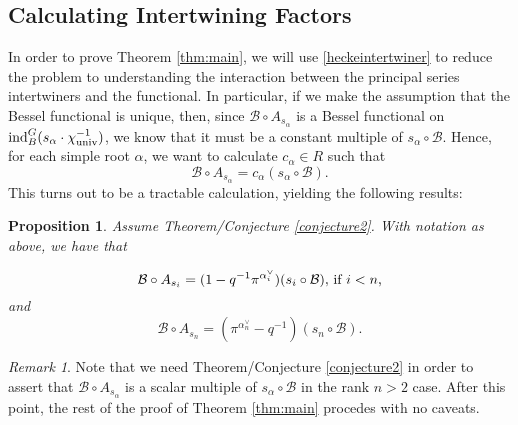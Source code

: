 \documentclass[11pt,letterpaper]{article}
\newcommand{\A}{\mathcal{A}}
\newcommand{\calB}{\mathcal{B}}
\newcommand{\ind}{\textup{ind}}
\newtheorem{Proposition}[Theorem]{Proposition}
\theoremstyle{remark}
\newtheorem*{remark}{Remark}
\numberwithin{equation}{section}
\begin{document}
\subsection{Calculating Intertwining Factors}\label{sec:intercalcn}

In order to prove Theorem \ref{thm:main}, we will use \eqref{heckeintertwiner} to reduce the problem to understanding the interaction between the principal series intertwiners and the functional. In particular, if we make the assumption that the Bessel functional is unique, then, since $\calB \circ A_{s_{\alpha}}$ is a Bessel functional on $\ind_B^G(s_{\alpha}\cdot \chi_{\textup{univ}}^{-1})$, we know that it must be a constant multiple of $s_{\alpha} \circ \calB$. Hence, for each simple root $\alpha$, we want to calculate $c_{\alpha} \in R$ such that $$\calB \circ A_{s_{\alpha}} = c_{\alpha}(s_{\alpha} \circ \calB).$$ This turns out to be a tractable calculation, yielding the following results:



\begin{Proposition} \label{intertwiners}
Assume Theorem/Conjecture \ref{conjecture2}. With notation as above, we have that

\begin{equation} \label{intertwiner1}
\calB \circ A_{s_i} = (1-q^{-1}\pi^{\alpha_i^{\vee}})(s_{i}\circ \calB), \,\textup{if $i<n$,}
\end{equation}
and
\begin{equation} \label{intertwiner2}
\calB \circ A_{s_n} = (\pi^{\alpha_n^{\vee}}-q^{-1})(s_n\circ \calB).
\end{equation}
\end{Proposition}

\begin{remark}
Note that we need Theorem/Conjecture \ref{conjecture2} in order to assert that $\calB \circ A_{s_{\alpha}}$ is a scalar multiple of $s_{\alpha} \circ \calB$ in the rank $n>2$ case. After this point, the rest of the proof of Theorem \ref{thm:main} procedes with no caveats.
\end{remark}
\end{document}
